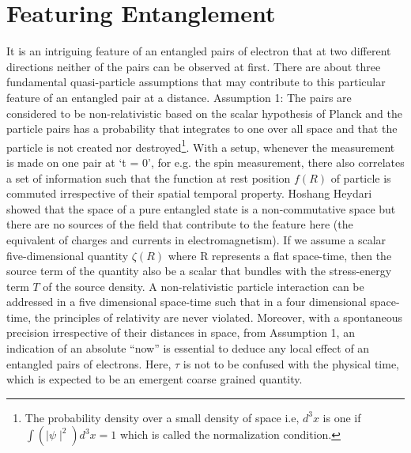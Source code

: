 \documentclass{article}
\begin{document}
\section{Featuring Entanglement}
It is an intriguing feature of an entangled pairs of electron that at two different directions neither of the pairs can be observed at first. There are about three fundamental quasi-particle assumptions that may contribute to this particular feature of an entangled pair at a distance.\vspace{4mm} \newline 
Assumption 1: The pairs are considered to be non-relativistic based on the scalar hypothesis of Planck and the particle pairs has a probability that integrates to one over all space and that the particle is not created nor destroyed\footnote{The probability density over a small density of space i.e, $d^3 x$ is one if $\int (\mid \psi \mid^2 )d^3 x = 1$ which is called the normalization condition.}. With a setup, whenever the measurement is made on one pair at ‘t = 0’, for e.g. the spin measurement, there also correlates a set of information such that the function at rest position $f(R)$ of particle is commuted irrespective of their spatial temporal property. Hoshang Heydari showed that the space of a pure entangled state is a non-commutative space \cite{5} but there are no sources of the field that contribute to the feature here (the equivalent of charges and currents in electromagnetism). If we assume a scalar five-dimensional quantity $\zeta(R)$ where R represents a flat space-time, then the source term of the quantity also be a scalar that bundles with the stress-energy term $T$ of the source density. A non-relativistic particle interaction can be addressed in a five dimensional space-time such that in a four dimensional space-time, the principles of relativity are never violated. Moreover, with a spontaneous precision irrespective of their distances in space, from Assumption 1, an indication of an absolute “now” is essential to deduce any local effect of an entangled pairs of electrons. Here, $\tau$ is not to be confused with the physical time, which is expected to be an emergent coarse grained quantity.\vspace{4mm} \newline
\end{document}
